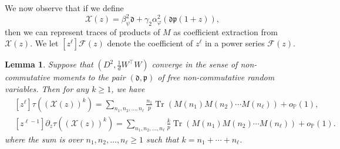 \documentclass[letterpaper, 10pt, dvipsnames]{article}
\numberwithin{equation}{section}
\DeclareMathOperator{\Tr}{Tr}
\renewcommand{\phi}{\varphi}
\renewcommand{\P}{\mathds{P}}
\newtheorem{lem}[ccounter]{Lemma}
\theoremstyle{definition}
\begin{document}
We now observe that if we define 
\[
\mathcal{X}(z) = \beta_\psi^2 \mathfrak{d} + {\gamma_2\alpha_\phi^2}\left( \mathfrak{d}\mathfrak{p}(1+z) \right),
\]
then we can represent traces of products of $M$ as coefficient extraction from $\mathcal{X}(z)$.  We let $[z^\ell]\mathcal{F}(z)$ denote the coefficient of $z^\ell$ in a power series $\mathcal{F}(z)$.
\begin{lem}\label{lem:coefficientextraction}
  Suppose that $(D^2, \tfrac{1}{d}W^{\top}W)$ converge in the sense of non-commutative moments to the pair $(\mathfrak{d}, \mathfrak{p})$ of free non-commutative random variables.  Then for any $k \geq 1$, we have 
  \[
  \begin{aligned}
    &[z^\ell]\tau(\left( \mathcal{X}(z) \right)^k) = \sum_{n_1,n_2,\dots,n_\ell} \frac{n_1}{p} \Tr( M(n_1)M(n_2)\cdots M(n_\ell)) + o_{\P}(1), \\
    &[z^{\ell-1}]\partial_z\tau(\left( \mathcal{X}(z) \right)^{k}) = \sum_{n_1,n_2,\dots,n_\ell} \frac{k}{p}\Tr( M(n_1)M(n_2)\cdots M(n_\ell)) + o_{\P}(1).
  \end{aligned}
  \]
  where the sum is over $n_1,n_2,\dots,n_\ell \geq 1$ such that $k = n_1+\cdots+n_\ell$.
\end{lem}
\end{document}
